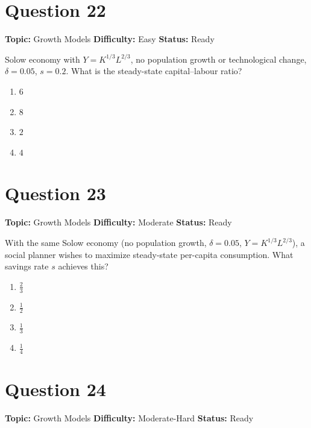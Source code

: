 \documentclass[11pt]{article}
\begin{document}
\newpage

\section*{Question 22}


\noindent\textbf{Topic:} Growth Models \quad \textbf{Difficulty:} Easy \quad \textbf{Status:} Ready



Solow economy with $Y=K^{1/3}L^{2/3}$, no population growth or technological change, $\delta=0.05$, $s=0.2$. What is the steady-state capital--labour ratio?
\begin{enumerate}[label=(\Alph*)]
\item $6$
\item $8$
\item $2$
\item $4$
\end{enumerate}

\newpage

\section*{Question 23}


\noindent\textbf{Topic:} Growth Models \quad \textbf{Difficulty:} Moderate \quad \textbf{Status:} Ready



With the same Solow economy (no population growth, $\delta=0.05$, $Y=K^{1/3}L^{2/3}$), a social planner wishes to maximize steady-state per-capita consumption. What savings rate $s$ achieves this?
\begin{enumerate}[label=(\Alph*)]
\item $\tfrac{2}{3}$
\item $\tfrac{1}{2}$
\item $\tfrac{1}{3}$
\item $\tfrac{1}{4}$
\end{enumerate}

\newpage

\section*{Question 24}


\noindent\textbf{Topic:} Growth Models \quad \textbf{Difficulty:} Moderate-Hard \quad \textbf{Status:} Ready
\end{document}
